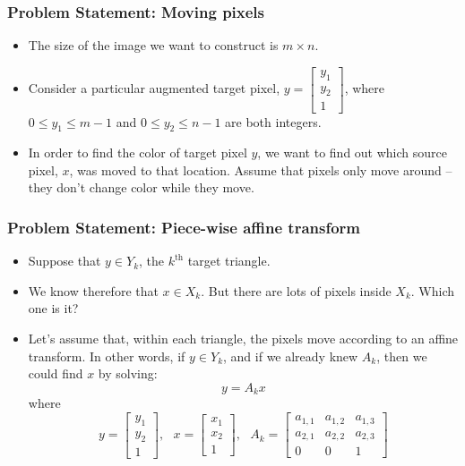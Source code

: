 \documentclass{beamer}
\begin{document}
\begin{frame}
  \frametitle{Problem Statement: Moving pixels}

  \begin{itemize}
  \item
    The size of the image we want to construct is $m\times n$.
  \item
    Consider a particular augmented target pixel,
    $y=\left[\begin{array}{c}y_1\\y_2\\1\end{array}\right]$, where $0\le
    y_1\le m-1$ and $0\le y_2\le n-1$ are both integers.
  \item
    In order to find the color of target pixel $y$, we want to find
    out which source pixel, $x$, was moved to that location.  Assume
    that pixels only move around -- they don't change color while they
    move.
  \end{itemize}
\end{frame}
\begin{frame}
  \frametitle{Problem Statement: Piece-wise affine transform}

  \begin{itemize}
  \item
    Suppose that $y\in Y_k$, the $k^{\text{th}}$ target
    triangle.
  \item
    We know therefore that $x\in X_k$.  But there are lots
    of pixels inside $X_k$.  Which one is it?
  \item
    Let's assume that, within each triangle, the pixels move according
    to an affine transform.  In other words, if $y\in Y_k$,
    and if we already knew $A_k$, then we could find $x$ by solving:
    \begin{displaymath}
      y = A_k x
    \end{displaymath}
    where
    \[
    y=\left[\begin{array}{c}y_1\\y_2\\1\end{array}\right],~~~
    x=\left[\begin{array}{c}x_1\\x_2\\1\end{array}\right],~~~
    A_k=\left[\begin{array}{ccc}a_{1,1}&a_{1,2}&a_{1,3}\\a_{2,1}&a_{2,2}&a_{2,3}\\0&0&1\end{array}\right]
    \]
  \end{itemize}
\end{frame}
\end{document}
